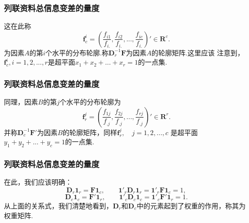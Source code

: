 \begin{frame}\frametitle{\color{blue}列联资料总信息变差的量度}


\quad\quad
 这在此称
   $$\mathbf{f}_{c}^{i}=(\frac{f_{i1}}{f_{i.}},\frac{f_{i2}}{f_{i.}},...,\frac{f_{ic}}{f_{i.}})'
         \in\mathbf{R}^{c}.$$
为因素$A$的第$i$个水平的分布轮廓.称$\mathbf{D}^{-1}_{r}\mathbf{F}$为因素$A$的轮廓矩阵.这里应该
注意到，$\mathbf{f}^{i}_{c},$\quad$i=1,2,...,r$是超平面$x_{1}+x_{2}+...+x_{r}=1$的一点集.\\

\end{frame}

\begin{frame}\frametitle{\color{blue}列联资料总信息变差的量度}

\quad\quad
 同理，因素$B$的第$j$个水平的分布轮廓为
$$\mathbf{f}_{r}^{j}=(\frac{f_{1j}}{f_{.j}},\frac{f_{2j}}{f_{.j}},...,\frac{f_{rj}}{f_{.j}})'
    \in\mathbf{R}^{r}.$$
并称$\mathbf{D}^{-1}_{c}\mathbf{F}'$为因素$B$的轮廓矩阵，同样$\mathbf{f}_{r}^{j},\quad
j=1,2,...,c$
是超平面$y_{1}+y_{2}+...+y_{c}=1$的一点集.\\

\end{frame}
\begin{frame}\frametitle{\color{blue}列联资料总信息变差的量度}


\quad\quad
 在此，我们应该明确：
   $$\mathbf{D}_{r}\mathbf{1}_{r}=\mathbf{F}\mathbf{1}_{c},\quad\quad
          \mathbf{1}'_{r}\mathbf{D}_{r}\mathbf{1}_{r}=\mathbf{1}'_{r}\mathbf{F}\mathbf{1}_{c}=1,$$
   $$\mathbf{D}_{c}\mathbf{1}_{c}=\mathbf{F}'\mathbf{1}_{r},\quad\quad
          \mathbf{1}'_{c}\mathbf{D}_{c}\mathbf{1}_{c}=\mathbf{1}'_{c}\mathbf{F}'\mathbf{1}_{r}=1.$$
从上面的关系式，我们清楚地看到，$\mathbf{D}_{r}$和$\mathbf{D}_{c}$中的元素起到了权重的作用，称其为
权重矩阵.

\end{frame}
